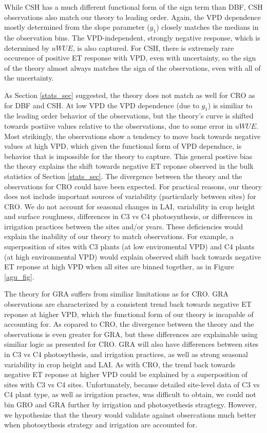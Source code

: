 \documentclass[draft,linenumbers]{agujournal}
\begin{document}
While CSH has a much different functional form of the sign term than DBF, CSH observations also match our theory to leading order. Again, the VPD dependence mostly determined from the slope parameter ($g_1$) closely matches the medians in the observation bins. The VPD-independent, strongly negative response, which is determined by $uWUE$, is also captured. For CSH, there is extremely rare occurence of positive ET response with VPD, even with uncertainty, so the sign of the theory almost always matches the sign of the observations, even with all of the uncertainty.

As Section \ref{stats_sec} suggested, the theory does not match as well for CRO as for DBF and CSH. At low VPD the VPD dependence (due to $g_1$) is similiar to the leading order behavior of the observations, but the theory's curve is shifted towards postiive values relative to the observations, due to some error in $uWUE$. Most strikingly, the observations show a tendency to move back towards negative values at high VPD, which given the functional form of VPD dependnce, is behavior that is impossible for the theory to capture. This general postive bias the theory explains  the shift towards negative ET reponse observed in the bulk statistics of Section \ref{stats_sec}. The divergence between the theory and the observations for CRO could have been expected. For practical reasons, our theory does not include important sources of variability (particularly between sites) for CRO. We do not account for seasonal changes in LAI, variability in crop height and surface roughness, differences in C3 vs C4 photosynthesis, or differences in irrigation practices between the sites and/or years. These deficiencies would explain the inability of our theory to match observations. For example, a superposition of sites with C3 plants (at low enviromental VPD) and C4 plants (at high environmental VPD) would explain observed shift back towards negative ET reponse at high VPD when all sites are binned together, as in Figure \ref{agu_fig}.  

The theory for GRA suffers from similiar limitations as for CRO. GRA observations are characterized by a consistent trend back towards negative ET reponse at higher VPD, which the functional form of our theory is incapable of accounting for. As copared to CRO, the divergence between the theory and the observations is even greater for GRA, but these differences are explainable using similiar logic as presented for CRO. GRA will also have differences between sites in C3 vs C4 photosythesis, and irrigation practices, as well as strong seasonal variability in crop height and LAI. As with CRO, the trend back towards negative ET reponse at higher VPD could be explained by a superposition of sites with C3 vs C4 sites. Unfortunately, because detailed site-level data of C3 vs C4 plant type, as well as irrigation practes, was difficult to obtain, we could not bin GRO and GRA further by irrigation and photosyethesis stragtegy. However, we hypothesize that the theory would validate against obsercations much better when photosythesis strategy and irrigation are accounted for. 
\end{document}
